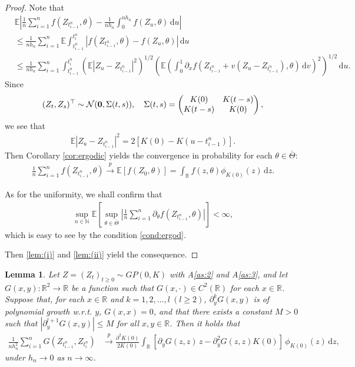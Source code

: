 \documentclass[a4paper,10pt,twoside]{article}
\newtheorem{lem}{Lemma}[section]
\numberwithin{equation}{section}
\def\R{\mathbb{R}}
\def\N{\mathbb{N}}
\def\l{\left}
\def\r{\right}
\def\th{\theta}
\def\p{\partial}
\def\toP{\stackrel{p}{\longrightarrow}}
\def\E{\mathbb{E}}
\def\mb#1{\mbox{\boldmath $#1$}}
\def\ol#1{\overline{#1}}
\def\df{\mathrm{d}}
\begin{document}
\begin{proof}
Note that
\begin{align*}
&\E\l| \frac{1}{n} \sum_{i=1}^n f(Z_{t_{i-1}^n},\th)  - \frac{1}{nh_n} \int_0^{nh_n} f(Z_u,\th)\,\df u \r| \\
&\le \frac{1}{nh_n} \sum_{i=1}^n \E\int_{t_{i-1}^n}^{t_i^n} |f(Z_{t_{i-1}^n},\th) - f(Z_u,\th)|\,\df u \\
&\le  \frac{1}{nh_n} \sum_{i=1}^n \int_{t_{i-1}^n}^{t_i^n}  \l(\E| Z_u - Z_{t_{i-1}^n}|^2\r)^{1/2}\l( \E\l(\int_0^1 \p_x f(Z_{t_{i-1}^n} + v (Z_u - Z_{t_{i-1}^n}), \th)\,\df v\r)^2\r)^{1/2}\,\df u. 
\end{align*}
Since 
\[
(Z_t,Z_s)^\top \sim {\cal N}(\mb{0}, \Sigma(t,s)),\quad \Sigma(t,s) = 
\begin{pmatrix}
K(0) & K(t-s)\\ 
K(t-s) & K(0)
 \end{pmatrix}, 
\]
we see that
\begin{align*}
\E| Z_u - Z_{t_{i-1}^n}|^2 = 2\l[K(0)- K(u - t_{i-1}^n)\r]. 
\end{align*}
Then Corollary \ref{cor:ergodic} yields the convergence in probability for each $\th\in \ol{\Theta}$:
\begin{align}
\frac{1}{n} \sum_{i=1}^n f(Z_{t_{i-1}^n},\th)  \toP \E[f(Z_0,\th)] = \int_\R f(z,\th)\phi_{K(0)}(z)\,\df z. \label{lem:(i)}
\end{align}

As for the uniformity,  we shall confirm that
\begin{align}
\sup_{n\in \N} \E\l[\sup_{\th \in \ol{\Theta}}\l| \frac{1}{n}\sum_{i=1}^n \p_\th f(Z_{t_{i-1}^n},\th)\r|\r] < \infty,  \label{lem:(ii)}
\end{align}
which is easy to see by the condition \eqref{cond:ergod}. 

Then \eqref{lem:(i)} and \eqref{lem:(ii)} yield the consequence.
\end{proof}



\begin{lem}\label{lem:GZ}
Let $Z = (Z_t)_{t \ge 0} \sim GP(0,K)$ with A\ref{as:2} and  A\ref{as:3}, and let $G(x,y) :\R^2\to \R$ be a function such that $G(x,\cdot)\in C^2(\R)$ for each $x\in \R$.
Suppose that, for each $x\in \R$ and $k=1,2,\dots, l \ (l\ge 2)$, $\p_y^kG(x,y)$ is of polynomial growth w.r.t. $y$, $G(x,x) = 0$, and that  there exists a constant $M>0$ such that $|\p_y^{l+1}G(x,y)| \le M$ for all $x,y\in \R$. Then it holds that
\begin{align*}
\frac{1}{nh_n^2}\sum_{i=1}^n G(Z_{t_{i-1}^n}, Z_{t_i^n})
&\toP  \frac{\p^2 K(0)}{2 K(0)}  \int_\R \l[\p_y G(z,z)\,z - \p_y^2 G(z, z)K(0)\r] \, \phi_{K(0)}(z)\,\df z,
\end{align*}
under $h_n\to 0$ as $n\to \infty$. 
\end{lem}
\end{document}
